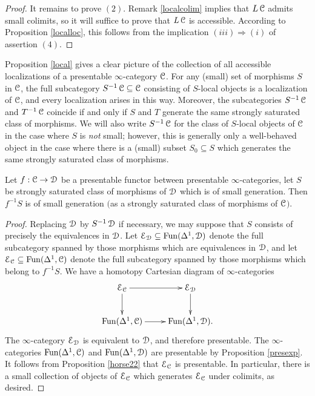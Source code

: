 \begin{proof}
It remains to prove $(2)$. Remark \ref{localcolim} implies that $L \operatorname{\mathcal{C}}$ admits small colimits, so
it will suffice to prove that $L \operatorname{\mathcal{C}}$ is accessible. According to Proposition \ref{localloc}, 
this follows from the implication $(iii) \Rightarrow (i)$ of assertion $(4)$.
\end{proof}

Proposition \ref{local} gives a clear picture of the collection of all accessible localizations of a presentable $\infty$-category $\operatorname{\mathcal{C}}$. For any (small) set of morphisms $S$ in $\operatorname{\mathcal{C}}$, the full subcategory $S^{-1} \operatorname{\mathcal{C}} \subseteq \operatorname{\mathcal{C}}$ consisting of $S$-local objects is a localization of $\operatorname{\mathcal{C}}$, and every localization arises in this way. Moreover, the subcategories $S^{-1} \operatorname{\mathcal{C}}$ and $T^{-1} \operatorname{\mathcal{C}}$
coincide if and only if $S$ and $T$ generate the same strongly saturated class of morphisms.
We will also write $S^{-1} \operatorname{\mathcal{C}}$ for the class of $S$-local objects of $\operatorname{\mathcal{C}}$ in the case where $S$ is {\em not} small; however, this is generally only a well-behaved object in the case where there is a (small) subset $S_0 \subseteq S$ which generates the same strongly saturated class of morphisms.

\begin{proposition}\label{postbluse}
Let $f: \operatorname{\mathcal{C}} \rightarrow \operatorname{\mathcal{D}}$ be a presentable functor between presentable $\infty$-categories, let $S$ be strongly saturated class of morphisms of $\operatorname{\mathcal{D}}$ which is of small generation. Then $f^{-1} S$ is of small generation $($as a strongly saturated class of morphisms of $\operatorname{\mathcal{C}}${}$)$.
\end{proposition}

\begin{proof}
Replacing $\operatorname{\mathcal{D}}$ by $S^{-1} \operatorname{\mathcal{D}}$ if necessary, we may suppose that $S$ consists
of precisely the equivalences in $\operatorname{\mathcal{D}}$. Let $\operatorname{\mathcal{E}}_{\operatorname{\mathcal{D}}} \subseteq \operatorname{Fun}(\Delta^1,\operatorname{\mathcal{D}})$ denote the full subcategory spanned by those morphisms which are equivalences in $\operatorname{\mathcal{D}}$, and let
$\operatorname{\mathcal{E}}_{\operatorname{\mathcal{C}}} \subseteq \operatorname{Fun}(\Delta^1,\operatorname{\mathcal{C}})$ denote the full subcategory spanned by
those morphisms which belong to $f^{-1} S$. We have a homotopy Cartesian diagram
of $\infty$-categories
$$ \xymatrix{ \calE_{\calC} \ar[r] \ar[d] & \calE_{\calD} \ar[d] \\
\Fun(\Delta^1,\calC) \ar[r] & \Fun(\Delta^1,\calD). }$$
The $\infty$-category $\operatorname{\mathcal{E}}_{\operatorname{\mathcal{D}}}$ is equivalent to $\operatorname{\mathcal{D}}$, and therefore presentable.
The $\infty$-categories $\operatorname{Fun}(\Delta^1,\operatorname{\mathcal{C}})$ and $\operatorname{Fun}(\Delta^1,\operatorname{\mathcal{D}})$ are presentable by 
Proposition \ref{presexp}. It follows from Proposition \ref{horse22} that $\operatorname{\mathcal{E}}_{\operatorname{\mathcal{C}}}$
is presentable. In particular, there is a small collection of objects of $\operatorname{\mathcal{E}}_{\operatorname{\mathcal{C}}}$ which generates $\operatorname{\mathcal{E}}_{\operatorname{\mathcal{C}}}$ under colimits, as desired.
\end{proof}

